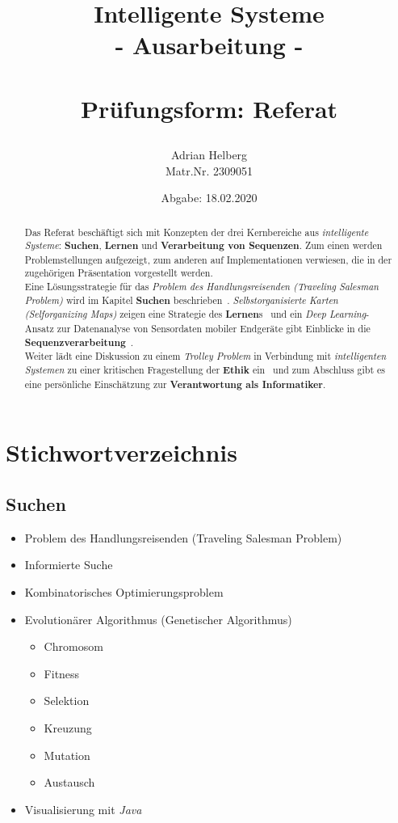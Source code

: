 \documentclass[11pt]{article}
\title{
    \begin{center}
        \Huge \textbf{Intelligente Systeme}\\
        {\color{blue}- Ausarbeitung -}\\~\\
        \Large Prüfungsform: Referat
    \end{center}
}
\author{Adrian Helberg\\ Matr.Nr. 2309051}
\date{Abgabe: 18.02.2020}
\begin{document}
    \maketitle

    \begin{abstract}
        Das Referat beschäftigt sich mit Konzepten der drei Kernbereiche aus \textit{intelligente
        Systeme}: \textbf{Suchen}, \textbf{Lernen} und \textbf{Verarbeitung von Sequenzen}. Zum
        einen werden Problemstellungen aufgezeigt, zum anderen auf Implementationen verwiesen, die
        in der zugehörigen Präsentation vorgestellt werden.\\ Eine
        Lösungsstrategie für das \textit{Problem des Handlungsreisenden (Traveling Salesman
        Problem)} wird im Kapitel \textbf{Suchen} beschrieben~\cite{suchen, salesman, impl}.
        \textit{Selbstorganisierte Karten (Selforganizing Maps)} zeigen eine Strategie des
        \textbf{Lernen}s~\cite{lernen, som} und ein \textit{Deep Learning}- Ansatz zur Datenanalyse
        von Sensordaten mobiler Endgeräte gibt Einblicke in die
        \textbf{Sequenzverarbeitung}~\cite{sequenzen}.\\
        Weiter lädt eine  Diskussion zu einem \textit{Trolley Problem} in Verbindung mit
        \textit{intelligenten Systemen} zu einer kritischen Fragestellung der \textbf{Ethik}
        ein~\cite{trolley} und zum Abschluss gibt es eine persönliche Einschätzung zur
        \textbf{Verantwortung als Informatiker}.
    \end{abstract}

    \tableofcontents
    \newpage

    \section{Stichwortverzeichnis}

    \subsection{Suchen}

    \begin{itemize}
        \item Problem des Handlungsreisenden (Traveling Salesman Problem)
        \item Informierte Suche
        \item Kombinatorisches Optimierungsproblem
        \item Evolutionärer Algorithmus (Genetischer Algorithmus)
        \begin{itemize}
            \item Chromosom
            \item Fitness
            \item Selektion
            \item Kreuzung
            \item Mutation
            \item Austausch
        \end{itemize}
        \item Visualisierung mit \textit{Java}
    \end{itemize}
\end{document}
